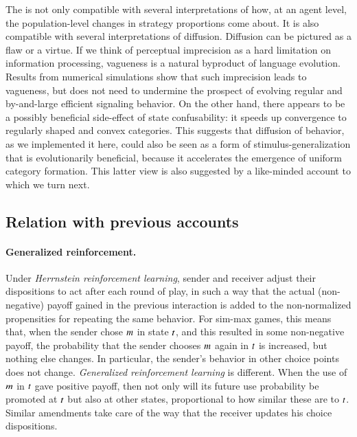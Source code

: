 \documentclass[fleqn,reqno,10pt]{article}
\newcommand{\rdd}{\acro{rdd}} %
\begin{document}
The \rdd is not only compatible with several interpretations of how,
at an agent level, the population-level changes in strategy
proportions come about. It is also compatible with several
interpretations of diffusion. Diffusion can be pictured as a flaw or a
virtue. If we think of perceptual imprecision as a hard limitation on
information processing, vagueness is a natural byproduct of language
evolution. Results from numerical simulations show that such
imprecision leads to vagueness, but does not need to undermine the
prospect of evolving regular and by-and-large efficient signaling
behavior. On the other hand, there appears to be a possibly beneficial
side-effect of state confusability: it speeds up convergence to
regularly shaped and convex categories. This suggests that diffusion
of behavior, as we implemented it here, could also be seen as a form
of stimulus-generalization that is evolutionarily beneficial, because
it accelerates the emergence of uniform category formation. This
latter view is also suggested by a like-minded account to which we
turn next.

\subsection{Relation with previous accounts}
\label{sec:relat-with-prev}

\paragraph{Generalized reinforcement.}

Under \emph{Herrnstein reinforcement learning}, sender and receiver
adjust their dispositions to act after each round of play, in such a
way that the actual (non-negative) payoff gained in the previous
interaction is added to the non-normalized propensities for repeating
the same behavior. For sim-max games, this means that, when the sender
chose $m$ in state $t$, and this resulted in some
non-negative payoff, the probability that the sender chooses $m$
again in $t$ is increased, but nothing else changes. In
particular, the sender's behavior in other choice points does not
change. \emph{Generalized reinforcement learning} is different. When
the use of $m$ in $t$ gave positive payoff, then not only
will its future use probability be promoted at $t$ but also at
other states, proportional to how similar these are to
$t$. Similar amendments take care of the way that the receiver
updates his choice dispositions.
\end{document}
